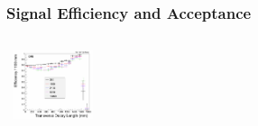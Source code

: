 \documentclass{beamer}
\begin{document}
\begin{frame}
 \frametitle{Signal Efficiency and Acceptance}

   \begin{minipage}[t]{0.83\paperwidth}
 
  \begin{columns}
     \begin{column}{0.50\linewidth}
       \begin{tcolorbox}[colback=UNL@Cream!5,colframe=UNL@LightGrey!70,title=\textcolor{UMN@Maroon}{\textbf{Efficiency}}]
    \mbox{
           \includegraphics[height=2cm,width=\textwidth]{THESISPLOTS/Eff_ctbgT.png}}
       \end{tcolorbox}    
     \end{column}
     \begin{column}{0.50\linewidth}
     \begin{tcolorbox}[colback=UNL@Cream!5,colframe=UNL@LightGrey!70,title=\textcolor{UMN@Maroon}{\textbf{Acceptance }}]
     

\end{tcolorbox}
\end{column}
\end{columns}
\end{minipage}
\end{frame}
\end{document}
